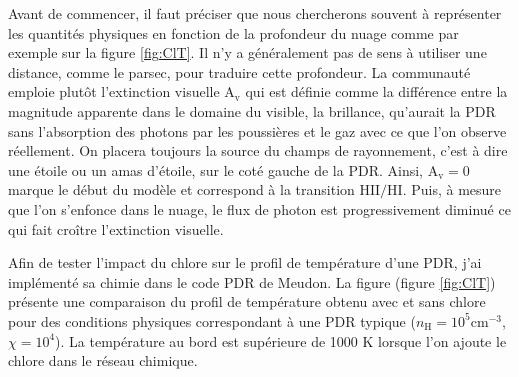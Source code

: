 Avant de commencer, il faut préciser que nous chercherons souvent à représenter les quantités physiques en fonction de la profondeur du nuage comme par exemple sur la figure \ref{fig:ClT}. Il n'y a généralement pas de sens à utiliser une distance, comme le parsec, pour traduire cette profondeur. La communauté emploie plutôt l'extinction visuelle $\mathrm{A}_\mathrm{v}$ qui est définie comme la différence entre la magnitude apparente dans le domaine du visible, la brillance, qu'aurait la PDR sans l'absorption des photons par les poussières et le gaz avec ce que l'on observe réellement. On placera toujours la source du champs de rayonnement, c'est à dire une étoile ou un amas d'étoile, sur le coté gauche de la PDR. Ainsi, $\mathrm{A}_\mathrm{v} = 0$ marque le début du modèle et correspond à la transition $\mathrm{HII}/\mathrm{HI}$. Puis, à mesure que l'on s'enfonce dans le nuage, le flux de photon est progressivement diminué ce qui fait croître l'extinction visuelle. \newline 

Afin de tester l'impact du chlore sur le profil de température d'une PDR, j'ai implémenté sa chimie dans le code PDR de Meudon. La figure (figure \ref{fig:ClT}) présente une comparaison du profil de température obtenu avec et sans chlore pour des conditions physiques correspondant à une PDR typique ($n_{\mathrm{H}} = 10^5 \mathrm{cm}^{-3}$, $\chi = 10^4$). La température au bord est supérieure de 1000 K lorsque l'on ajoute le chlore dans le réseau chimique. \newline 

